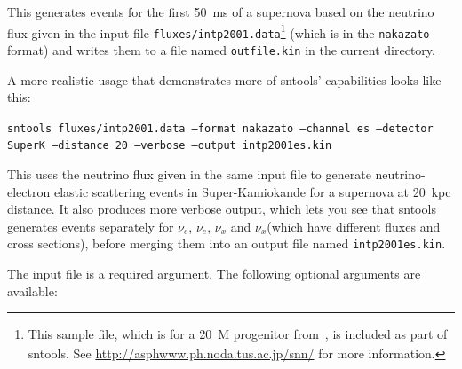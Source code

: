 \documentclass[11pt, oneside]{article}
\newcommand{\nue}{\ensuremath{\nu_e}\xspace}
\newcommand{\nux}{\ensuremath{\nu_x}\xspace}
\newcommand{\nuebar}{\ensuremath{\bar{\nu}_e}\xspace}
\newcommand{\nuxbar}{\ensuremath{\bar{\nu}_x}\xspace}
\begin{document}
This generates events for the first \SI{50}{ms} of a supernova based on the neutrino flux given in the input file \texttt{fluxes/intp2001.data}\footnote{This sample file, which is for a \SI{20}{M_\odot} progenitor from~\cite{Nakazato2013}, is included as part of sntools. See \url{http://asphwww.ph.noda.tus.ac.jp/snn/} for more information.} (which is in the \texttt{nakazato} format) and writes them to a file named \texttt{outfile.kin} in the current directory.

A more realistic usage that demonstrates more of sntools’ capabilities looks like this:

\texttt{sntools fluxes/intp2001.data --format nakazato --channel es --detector SuperK --distance 20 --verbose --output intp2001es.kin}

This uses the neutrino flux given in the same input file to generate neutrino-electron elastic scattering events in Super-Kamiokande for a supernova at \SI{20}{kpc} distance.
It also produces more verbose output, which lets you see that sntools generates events separately for \nue, \nuebar, \nux and \nuxbar (which have different fluxes and cross sections), before merging them into an output file named \texttt{intp2001es.kin}.


The input file is a required argument. The following optional arguments are available:
\end{document}
